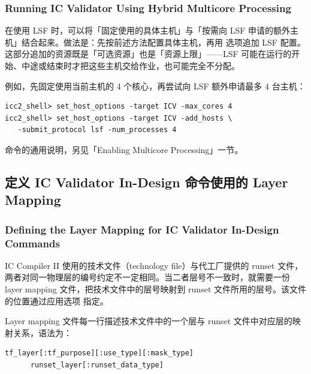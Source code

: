 \subsubsection*{Running IC Validator Using Hybrid Multicore Processing}

在使用 LSF 时，可以将「固定使用的具体主机」与「按需向 LSF 申请的额外主机」结合起来。做法是：先按前述方法配置具体主机，再用  选项追加 LSF 配置。这部分追加的资源既是「可选资源」也是「资源上限」——LSF 可能在运行的开始、中途或结束时才把这些主机交给作业，也可能完全不分配。

例如，先固定使用当前主机的 4 个核心，再尝试向 LSF 额外申请最多 4 台主机：
\begin{lstlisting}
icc2_shell> set_host_options -target ICV -max_cores 4
icc2_shell> set_host_options -target ICV -add_hosts \
   -submit_protocol lsf -num_processes 4
\end{lstlisting}

\begin{seeAlsoBox}
 命令的通用说明，另见「Enabling Multicore Processing」一节。
\end{seeAlsoBox}

\subsection{定义 IC Validator In-Design 命令使用的 Layer Mapping}
\subsubsection*{Defining the Layer Mapping for IC Validator In-Design Commands}

IC Compiler II 使用的技术文件（technology file）与代工厂提供的 runset 文件，两者对同一物理层的编号约定不一定相同。当二者层号不一致时，就需要一份 layer mapping 文件，把技术文件中的层号映射到 runset 文件所用的层号。该文件的位置通过应用选项  指定。

Layer mapping 文件每一行描述技术文件中的一个层与 runset 文件中对应层的映射关系，语法为：

\begin{lstlisting}
tf_layer[:tf_purpose][:use_type][:mask_type]
      runset_layer[:runset_data_type]
\end{lstlisting}

